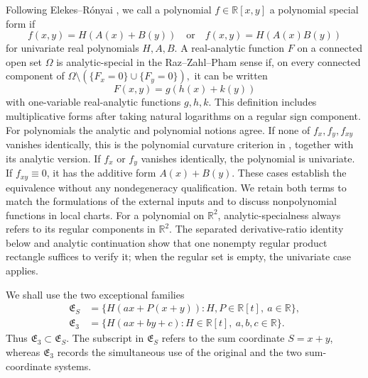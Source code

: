\documentclass[11pt]{article}
\begin{document}
Following Elekes--R\'onyai \cite{ER}, we call a polynomial
\(f\in\mathbb R[x,y]\) a
polynomial special form if
\begin{equation}
 f(x,y)=H(A(x)+B(y))
 \quad\text{or}\quad
 f(x,y)=H(A(x)B(y))
 \label{eq:polynomial-special}
\end{equation}
for univariate real polynomials \(H,A,B\).  A real-analytic function
\(F\) on a connected open set \(\Omega\) is
analytic-special in the Raz--Zahl--Pham sense if, on every
connected component of
\(
 \Omega\setminus(\{F_x=0\}\cup\{F_y=0\}),
\)
it can be written
\begin{equation}
 F(x,y)=g(h(x)+k(y))
 \label{eq:analytic-special}
\end{equation}
with one-variable real-analytic functions \(g,h,k\).  This definition
includes multiplicative forms after taking natural logarithms on a
regular sign component.  For polynomials the analytic and polynomial
notions agree.  If none of \(f_x,f_y,f_{xy}\) vanishes identically,
this is the polynomial curvature criterion in
\cite[Lemma~3.3]{RZ}, together with its analytic version.  If \(f_x\)
or \(f_y\) vanishes identically, the polynomial is univariate.  If
\(f_{xy}\equiv0\), it has the additive form \(A(x)+B(y)\).
These cases establish the equivalence without any nondegeneracy
qualification.  We retain both terms to match the formulations of
the external inputs and to discuss nonpolynomial functions in local
charts.  For a polynomial on \(\mathbb R^2\), analytic-specialness always
refers to its regular components in \(\mathbb R^2\).  The separated
derivative-ratio identity below and analytic continuation show that
one nonempty regular product rectangle suffices to verify it; when
the regular set is empty, the univariate case applies.

We shall use the two exceptional families
\begin{align}
 \mathfrak E_S
 &=\{H(ax+P(x+y)):H,P\in\mathbb R[t],\ a\in\mathbb R\},
 \label{eq:ES-main}\\
 \mathfrak E_3
 &=\{H(ax+by+c):H\in\mathbb R[t],\ a,b,c\in\mathbb R\}.
 \label{eq:E3-main}
\end{align}
Thus \(\mathfrak E_3\subset\mathfrak E_S\).  The subscript in
\(\mathfrak E_S\) refers to the sum coordinate \(S=x+y\), whereas
\(\mathfrak E_3\) records the simultaneous use of the original and
the two sum-coordinate systems.

\medskip
{}
\end{document}
